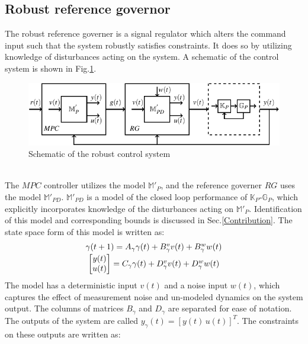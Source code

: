 \documentclass[letterpaper, 10 pt, conference]{ieeeconf}  %
\begin{document}
\begin{enumerate}
	\subsection{Robust reference governor}
	The robust reference governer is a signal regulator which alters the command input such that the system robustly satisfies constraints. It does so by utilizing knowledge of disturbances acting on the system. A schematic of the control system is shown in Fig.\ref{fullloop}. 
	\begin{figure}[h]
		\vspace{-3pt}
		\hspace{10pt}
		\includegraphics[scale = 0.8]{withRG.pdf}
		\caption{Schematic of the robust control system}
		\label{fullloop}
	\end{figure} \\
	The $MPC$ controller utilizes the model $\mathbb{M}'_{P}$, and the reference governer $RG$ uses the model $\mathbb{M}'_{PD}$. $\mathbb{M}'_{PD}$ is a model of the closed loop performance of $\mathbb{K}_P$-$\mathbb{G}_P$, which explicitly incorporates knowledge of the disturbances acting on $\mathbb{M}'_{P}$. Identification of this model and corresponding bounds is discussed in Sec.\ref{Contribution}. The state space form of this model is written as:
	\begin{equation*}
	\begin{matrix}
	\gamma(t+1) = A_\gamma\gamma(t) + B^v_\gamma v(t) + B^w_\gamma w(t) \vspace{2pt}\\
	\begin{bmatrix}y(t)\\u(t)\end{bmatrix} = C_\gamma\gamma(t) + D^v_\gamma v(t) + D^w_\gamma w(t)
	\end{matrix}
	\end{equation*}
	The model has a deterministic input $v(t)$ and a noise input $w(t)$, which captures the effect of measurement noise and un-modeled dynamics on the system output. 
	The columns of matrices $B_\gamma$ and $D_\gamma$ are separated for ease of notation. The outputs of the system are called $y_{\gamma}(t)=[y(t) \hspace{2pt} u(t)]^T$. The constraints on these outputs are written as: 

\end{enumerate}
\end{document}
